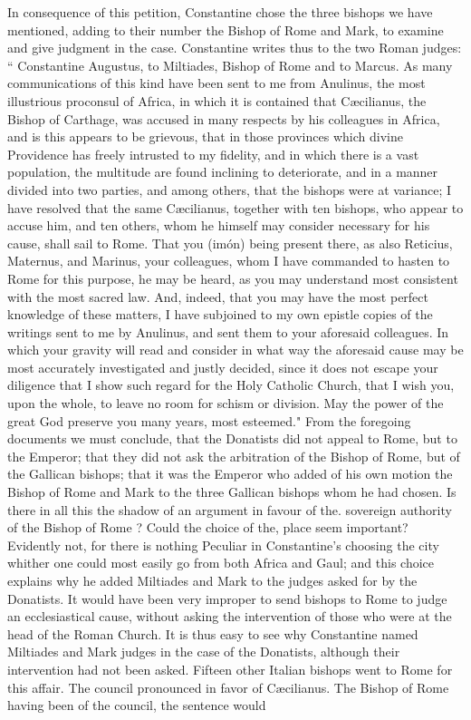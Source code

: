 In consequence of this petition, Constantine chose the three bishops we have mentioned, adding to their number the Bishop of Rome and Mark, to examine and give judgment in the case. Constantine writes thus to the two Roman judges: “ Constantine Augustus, to Miltiades, Bishop of Rome and to Marcus. As many communications of this kind have been sent to me from Anulinus, the most illustrious proconsul of Africa, in which it is contained that Cæcilianus, the Bishop of Carthage, was accused in many respects by his colleagues in Africa, and is this appears to be grievous, that in those provinces which divine Providence has freely intrusted to my fidelity, and in which there is a vast population, the multitude are found inclining to deteriorate, and in a manner divided into two parties, and among others, that the bishops were at variance; I have resolved that the same Cæcilianus, together with ten bishops, who appear to accuse him, and ten others, whom he himself may consider necessary for his cause, shall sail to Rome. That you (imón) being present there, as also Reticius, Maternus, and Marinus, your colleagues, whom I have commanded to hasten to Rome for this purpose, he may be heard, as you may understand most consistent with the most sacred law. And, indeed, that you may have the most perfect knowledge of these matters, I have subjoined to my own epistle copies of the writings sent to me by Anulinus, and sent them to your aforesaid colleagues. In which your gravity will read and consider in what way the aforesaid cause may be most accurately investigated and justly decided, since it does not escape your diligence that I show such regard for the Holy Catholic Church, that I wish you, upon the whole, to leave no room for schism or division. May the power of the great God preserve you many years, most esteemed." From the foregoing documents we must conclude, that the Donatists did not appeal to Rome, but to the Emperor; that they did not ask the arbitration of the Bishop of Rome, but of the Gallican bishops; that it was the Emperor who added of his own motion the Bishop of Rome and Mark to the three Gallican bishops whom he had chosen. Is there in all this the shadow of an argument in favour of the. sovereign authority of the Bishop of Rome ? Could the choice of the, place seem important? Evidently not, for there is nothing Peculiar in Constantine's choosing the city whither one could most easily go from both Africa and Gaul; and this choice explains why he added Miltiades and Mark to the judges asked for by the Donatists. It would have been very improper to send bishops to Rome to judge an ecclesiastical cause, without asking the intervention of those who were at the head of the Roman Church. It is thus easy to see why Constantine named Miltiades and Mark judges in the case of the Donatists, although their intervention had not been asked. Fifteen other Italian bishops went to Rome for this affair. The council pronounced in favor of Cæcilianus. The Bishop of Rome having been of the council, the sentence would

